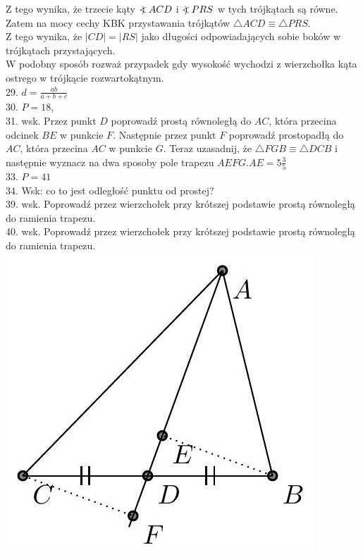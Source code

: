 \documentclass[10pt]{article}
\newcommand\Varangle{\mathop{{<\!\!\!\!\!\text{\small)}}\:}\nolimits}
\begin{document}
Z tego wynika, że trzecie kąty \(\Varangle A C D\) i \(\Varangle P R S\) w tych trójkątach są równe. Zatem na mocy cechy KBK przystawania trójkątów \(\triangle A C D \equiv \triangle P R S\).\\
Z tego wynika, że \(|C D|=|R S|\) jako długości odpowiadających sobie boków w trójkątach przystających.\\
W podobny sposób rozważ przypadek gdy wysokość wychodzi z wierzchołka kąta ostrego w trójkącie rozwartokątnym.\\
29. \(d=\frac{a b}{a+b+c}\)\\
30. \(P=18\),\\
31. wsk. Przez punkt \(D\) poprowadź prostą równoległą do \(A C\), która przecina odcinek \(B E\) w punkcie \(F\). Następnie przez punkt \(F\) poprowadź prostopadłą do \(A C\), która przecina \(A C\) w punkcie \(G\). Teraz uzasadnij, że \(\triangle F G B \equiv \triangle D C B\) i następnie wyznacz na dwa sposoby pole trapezu \(A E F G . A E=5 \frac{3}{5}\)\\
33. \(P=41\)\\
34. Wsk: co to jest odległość punktu od prostej?\\
39. wsk. Poprowadź przez wierzchołek przy krótszej podstawie prostą równoległą do ramienia trapezu.\\
40. wsk. Poprowadź przez wierzchołek przy krótszej podstawie prostą równoległą do ramienia trapezu.\\
\includegraphics[max width=\textwidth, center]{2024_11_21_71f62bd117d375398909g-068(1)}\\
\end{document}
